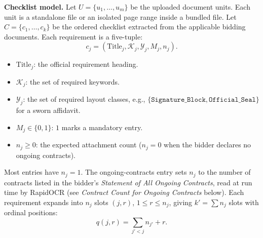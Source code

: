 \textbf{Checklist model.} Let $U = \{u_1,\ldots,u_m\}$ be the uploaded document units. Each unit is a standalone file or an isolated page range inside a bundled file. Let $C = \{c_1,\ldots,c_k\}$ be the ordered checklist extracted from the applicable bidding documents. Each requirement is a five-tuple:
\begin{equation}
\label{eq:checklist_tuple}
c_j = (\mathrm{Title}_j, \mathcal{K}_j, \mathcal{Y}_j, M_j, n_j).
\end{equation}
\begin{itemize}
    \item $\mathrm{Title}_j$: the official requirement heading.
    \item $\mathcal{K}_j$: the set of required keywords.
    \item $\mathcal{Y}_j$: the set of required layout classes, e.g., $\{\texttt{Signature\_Block}, \texttt{Official\_Seal}\}$ for a sworn affidavit.
    \item $M_j \in \{0, 1\}$: $1$ marks a mandatory entry.
    \item $n_j \ge 0$: the expected attachment count ($n_j = 0$ when the bidder declares no ongoing contracts).
\end{itemize}

Most entries have $n_j = 1$. The ongoing-contracts entry sets $n_j$ to the number of contracts listed in the bidder's \emph{Statement of All Ongoing Contracts}, read at run time by RapidOCR (see \emph{Contract Count for Ongoing Contracts} below). Each requirement expands into $n_j$ slots $(j, r)$, $1 \le r \le n_j$, giving $k' = \sum n_j$ slots with ordinal positions:
\begin{equation}
\label{eq:slot_ordinal}
q(j, r) = \sum_{j' < j} n_{j'} + r.
\end{equation}

